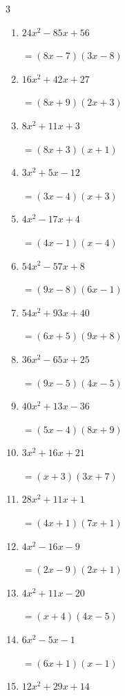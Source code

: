 \begin{multicols}{3}
\begin{enumerate}
        $=(2x-7)(5x-6)$

  \item $24x^{2}-85x+56$

        $=(8x-7)(3x-8)$

  \item $16x^{2}+42x+27$

        $=(8x+9)(2x+3)$

  \item $8x^{2}+11x+3$

        $=(8x+3)(x+1)$

  \item $3x^{2}+5x-12$

        $=(3x-4)(x+3)$

  \item $4x^{2}-17x+4$

        $=(4x-1)(x-4)$

\columnbreak %

  \item $54x^{2}-57x+8$

        $=(9x-8)(6x-1)$

  \item $54x^{2}+93x+40$

        $=(6x+5)(9x+8)$

  \item $36x^{2}-65x+25$

        $=(9x-5)(4x-5)$

  \item $40x^{2}+13x-36$

        $=(5x-4)(8x+9)$

  \item $3x^{2}+16x+21$

        $=(x+3)(3x+7)$

  \item $28x^{2}+11x+1$

        $=(4x+1)(7x+1)$

  \item $4x^{2}-16x-9$

        $=(2x-9)(2x+1)$

  \item $4x^{2}+11x-20$

        $=(x+4)(4x-5)$

  \item $6x^{2}-5x-1$

        $=(6x+1)(x-1)$

  \item $12x^{2}+29x+14$


\end{enumerate}
\end{multicols}
